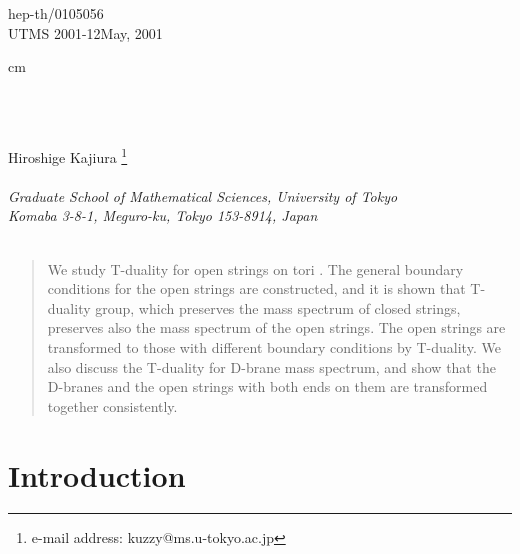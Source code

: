 \documentclass[a4paper,12pt]{article}
\providecommand{\T}{{\mathbb{T}}}
\begin{document}
\begin{titlepage}
\thispagestyle{empty}
\begin{flushleft}
\hfill hep-th/0105056\\
UTMS 2001-12\hfill May, 2001 \\
\end{flushleft}

 cm


\begin{center}
\\
\noindent{
 }\\
\renewcommand{\thefootnote}{\fnsymbol{footnote}}


\vskip 2cm
{\large 
Hiroshige Kajiura 
\footnote{e-mail address: kuzzy@ms.u-tokyo.ac.jp}\\

\noindent{ \bigskip }\\

\it
Graduate School of Mathematical Sciences, University of Tokyo \\
Komaba 3-8-1, Meguro-ku, Tokyo 153-8914, Japan\\
\noindent{\smallskip  }\\
}

\bigskip
\end{center}
\begin{abstract}
We study T-duality for open strings on tori \myHighlight{$\T^d$}\coordHE{}. The general boundary 
conditions for the open strings are constructed, and it is shown that 
T-duality group, which preserves
 the mass spectrum of closed strings, preserves also the mass spectrum
 of the open strings. The open strings are transformed to 
those with different boundary conditions by T-duality. We also discuss the 
T-duality for D-brane mass spectrum, and show that the D-branes and 
the open strings with both ends on them are transformed together 
consistently.

\end{abstract}
\vfill

\end{titlepage}
\vfill
\setcounter{footnote}{0}
\renewcommand{\thefootnote}{\arabic{footnote}}
\newpage


\section{Introduction}
\end{document}
